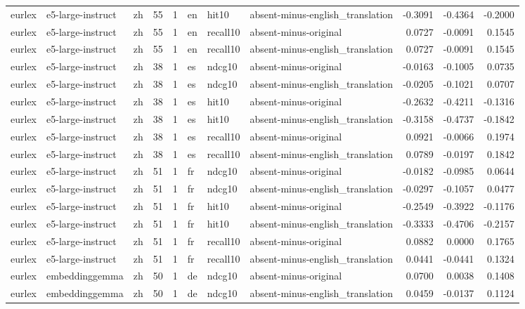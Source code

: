 \begin{tabular}{lllrrlllrrr}
eurlex & e5-large-instruct & zh & 55 & 1 & en & hit10 & absent-minus-english\_translation & -0.3091 & -0.4364 & -0.2000 \\
eurlex & e5-large-instruct & zh & 55 & 1 & en & recall10 & absent-minus-original & 0.0727 & -0.0091 & 0.1545 \\
eurlex & e5-large-instruct & zh & 55 & 1 & en & recall10 & absent-minus-english\_translation & 0.0727 & -0.0091 & 0.1545 \\
eurlex & e5-large-instruct & zh & 38 & 1 & es & ndcg10 & absent-minus-original & -0.0163 & -0.1005 & 0.0735 \\
eurlex & e5-large-instruct & zh & 38 & 1 & es & ndcg10 & absent-minus-english\_translation & -0.0205 & -0.1021 & 0.0707 \\
eurlex & e5-large-instruct & zh & 38 & 1 & es & hit10 & absent-minus-original & -0.2632 & -0.4211 & -0.1316 \\
eurlex & e5-large-instruct & zh & 38 & 1 & es & hit10 & absent-minus-english\_translation & -0.3158 & -0.4737 & -0.1842 \\
eurlex & e5-large-instruct & zh & 38 & 1 & es & recall10 & absent-minus-original & 0.0921 & -0.0066 & 0.1974 \\
eurlex & e5-large-instruct & zh & 38 & 1 & es & recall10 & absent-minus-english\_translation & 0.0789 & -0.0197 & 0.1842 \\
eurlex & e5-large-instruct & zh & 51 & 1 & fr & ndcg10 & absent-minus-original & -0.0182 & -0.0985 & 0.0644 \\
eurlex & e5-large-instruct & zh & 51 & 1 & fr & ndcg10 & absent-minus-english\_translation & -0.0297 & -0.1057 & 0.0477 \\
eurlex & e5-large-instruct & zh & 51 & 1 & fr & hit10 & absent-minus-original & -0.2549 & -0.3922 & -0.1176 \\
eurlex & e5-large-instruct & zh & 51 & 1 & fr & hit10 & absent-minus-english\_translation & -0.3333 & -0.4706 & -0.2157 \\
eurlex & e5-large-instruct & zh & 51 & 1 & fr & recall10 & absent-minus-original & 0.0882 & 0.0000 & 0.1765 \\
eurlex & e5-large-instruct & zh & 51 & 1 & fr & recall10 & absent-minus-english\_translation & 0.0441 & -0.0441 & 0.1324 \\
eurlex & embeddinggemma & zh & 50 & 1 & de & ndcg10 & absent-minus-original & 0.0700 & 0.0038 & 0.1408 \\
eurlex & embeddinggemma & zh & 50 & 1 & de & ndcg10 & absent-minus-english\_translation & 0.0459 & -0.0137 & 0.1124 \\

\end{tabular}
